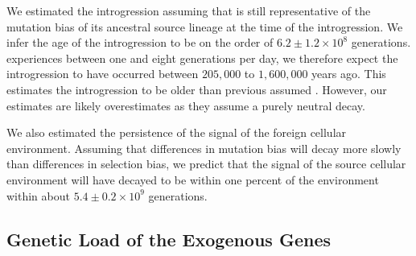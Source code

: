 \documentclass[12pt]{article}
\begin{document}
We estimated the introgression assuming that \gossypii is still representative of the mutation bias of its ancestral source lineage at the time of the introgression.
We infer the age of the introgression to be on the order of $6.2\pm1.2\times 10^8$ generations. 
\kluyveri experiences between one and eight generations per day, we therefore expect the introgression to have occurred between $205,000$ to $1,600,000$ years ago.
This estimates the introgression to be older than previous assumed \citet{friedrich2015}.
However, our estimates are likely overestimates as they assume a purely neutral decay.

We also estimated the persistence of the signal of the foreign cellular environment.
Assuming that differences in mutation bias will decay more slowly than differences in selection bias, we predict that the \DM signal of the source cellular environment will have decayed to be within one percent of the \kluyveri environment within about $5.4\pm0.2\times 10^9 $ generations.


\subsection*{Genetic Load of the Exogenous Genes}
\end{document}
